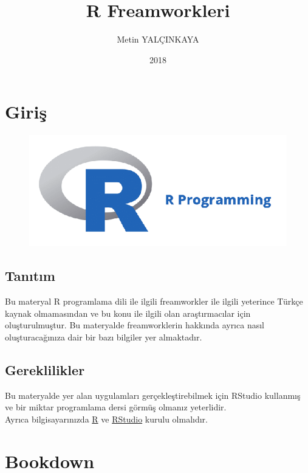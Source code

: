 \documentclass[]{book}
\title{R Freamworkleri}
\author{Metin YALÇINKAYA}
\date{2018}
\begin{document}
\maketitle

{
\setcounter{tocdepth}{1}
\tableofcontents
}
\chapter{Giriş}\label{giris}

\begin{figure}
\centering
\includegraphics{resim0.png}
\caption{}
\end{figure}

\section{Tanıtım}\label{tantm}

Bu materyal R programlama dili ile ilgili freamworkler ile ilgili
yeterince Türkçe kaynak olmamasından ve bu konu ile ilgili olan
araştırmacılar için oluşturulmuştur. Bu materyalde freamworklerin
hakkında ayrıca nasıl oluşturacağınıza dair bir bazı bilgiler yer
almaktadır.

\section{Gereklilikler}\label{gereklilikler}

Bu materyalde yer alan uygulamları gerçekleştirebilmek için RStudio
kullanmış ve bir miktar programlama dersi görmüş olmanız yeterlidir.\\
Ayrıca bilgisayarınızda \href{https://www.r-project.org/}{R} ve
\href{https://www.rstudio.com/}{RStudio} kurulu olmalıdır.

\chapter{Bookdown}\label{intro}
\end{document}
